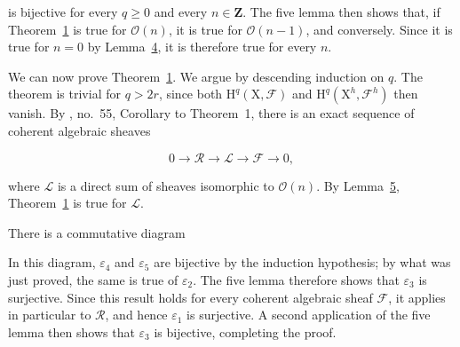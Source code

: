 is bijective for every $q\geqslant0$ and every $n\in\mathbf{Z}$. The five lemma then shows that, if Theorem~\hyperref[gaga:thm:1]{1} is true for $\mathcal{O}(n)$, it is true for $\mathcal{O}(n-1)$, and conversely. Since it is true for $n=0$ by Lemma~\hyperref[gaga:lemma:4]{4}, it is therefore true for every $n$.

We can now prove Theorem~\hyperref[gaga:thm:1]{1}. We argue by descending induction on $q$. The theorem is trivial for $q>2r$, since both $\mathrm{H}^q(\mathrm{X},\mathcal{F})$ and $\mathrm{H}^q(\mathrm{X}^h,\mathcal{F}^h)$ then vanish. By , no.~55, Corollary to Theorem~1, there is an exact sequence of coherent algebraic sheaves

\begin{equation*}
0\longrightarrow\mathcal{R}\longrightarrow\mathcal{L}
\longrightarrow\mathcal{F}\longrightarrow0,
\end{equation*}

where $\mathcal{L}$ is a direct sum of sheaves isomorphic to $\mathcal{O}(n)$. By Lemma~\hyperref[gaga:lemma:5]{5}, Theorem~\hyperref[gaga:thm:1]{1} is true for $\mathcal{L}$.

There is a commutative diagram

\begin{center}
\scriptsize
{}
\end{center}

In this diagram, $\varepsilon_4$ and $\varepsilon_5$ are bijective by the induction hypothesis; by what was just proved, the same is true of $\varepsilon_2$. The five lemma therefore shows that $\varepsilon_3$ is surjective. Since this result holds for every coherent algebraic sheaf $\mathcal{F}$, it applies in particular to $\mathcal{R}$, and hence $\varepsilon_1$ is surjective. A second application of the five lemma then shows that $\varepsilon_3$ is bijective, completing the proof.

